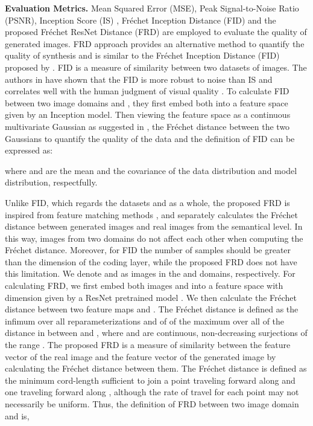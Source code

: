 \documentclass[sigconf]{acmart}
\begin{document}
\noindent\textbf{Evaluation Metrics.}
Mean Squared Error (MSE), Peak Signal-to-Noise Ratio (PSNR), Inception Score (IS) \cite{salimans2016improved}, Fr\'echet Inception Distance (FID) \cite{heusel2017gans} and the proposed Fr\'echet ResNet Distance (FRD) are employed to evaluate the quality of generated images.
FRD approach provides an alternative method to quantify the quality of synthesis and is similar to the Fr\'echet Inception Distance (FID) proposed by \cite{heusel2017gans}.
FID is a measure of similarity between two datasets of images. 
The authors in \cite{heusel2017gans} have shown that the FID is more robust to noise than IS \cite{salimans2016improved} and  correlates well with the human judgment of visual quality \cite{heusel2017gans}.
To calculate FID \cite{heusel2017gans} between two image domains  and , they first embed both into a feature space  given by an Inception model.
Then viewing the feature space as a continuous multivariate Gaussian as suggested in \cite{heusel2017gans}, the Fr\'echet distance between the two Gaussians to quantify the quality of the data and the definition of FID can be expressed as:

where  and  are the mean and the covariance of the data distribution and model distribution, respectfully.

Unlike FID, which regards the datasets  and  as a  whole, the proposed FRD  is inspired from feature matching methods \cite{tang2016novel,zheng2014packing,zheng2014bayes}, and separately calculates the Fr\'echet distance between generated images and real images from the semantical level.
In this way, images from two domains do not affect each other when computing the Fr\'echet distance.  
Moreover, for FID the number of samples should be greater than the dimension of the coding layer, while the proposed FRD does not have this limitation. 
We denote  and  as images in the   and  domains, respectively.
For calculating FRD, we first embed both images  and  into a feature space  with  dimension given by a ResNet pretrained model \cite{he2016deep}.
We then calculate the Fr\'echet distance between two feature maps  and .
The Fr\'echet distance  is defined as the infimum over all reparameterizations  and  of  of the maximum over all  of the distance in  between  and , where  and  are continuous, non-decreasing surjections of the range .
The proposed FRD is a measure of similarity between the feature vector of the real image   and the feature vector of the generated image  by calculating the Fr\'echet distance between them. The Fr\'echet distance is defined as the minimum cord-length sufficient to join a point traveling forward along  and one traveling forward along , although the rate of travel for each point may not necessarily be uniform. 
Thus, the definition of FRD between two image domain  and  is,
\end{document}
